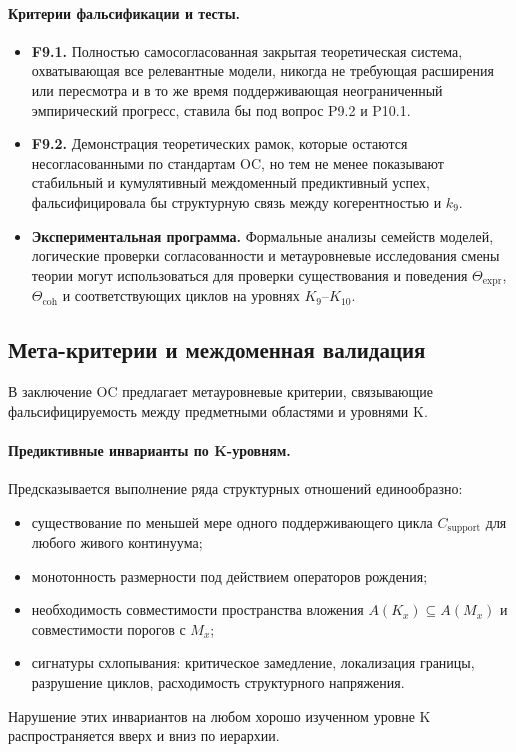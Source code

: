 \paragraph{Критерии фальсификации и тесты.}
\begin{itemize}
  \item \textbf{F9.1.}
        Полностью самосогласованная закрытая теоретическая система, охватывающая
        все релевантные модели, никогда не требующая расширения или пересмотра
        и в то же время поддерживающая неограниченный эмпирический прогресс,
        ставила бы под вопрос P9.2 и P10.1.
  \item \textbf{F9.2.}
        Демонстрация теоретических рамок, которые остаются несогласованными по
        стандартам OC, но тем не менее показывают стабильный и кумулятивный
        междоменный предиктивный успех, фальсифицировала бы структурную связь
        между когерентностью и \(k_9\).
  \item \textbf{Экспериментальная программа.}
        Формальные анализы семейств моделей, логические проверки
        согласованности и метауровневые исследования смены теории могут
        использоваться для проверки существования и поведения
        \(\Theta_{\mathrm{expr}}\), \(\Theta_{\mathrm{coh}}\) и
        соответствующих циклов на уровнях \(K_9\)–\(K_{10}\).
\end{itemize}

\subsection{Мета-критерии и междоменная валидация}

В заключение OC предлагает метауровневые критерии, связывающие
фальсифицируемость между предметными областями и уровнями K.

\paragraph{Предиктивные инварианты по K-уровням.}
Предсказывается выполнение ряда структурных отношений единообразно:
\begin{itemize}
  \item существование по меньшей мере одного поддерживающего цикла
        \(C_{\mathrm{support}}\) для любого живого континуума;
  \item монотонность размерности под действием операторов рождения;
  \item необходимость совместимости пространства вложения
        \(A(K_x)\subseteq A(M_x)\) и совместимости порогов с \(M_x\);
  \item сигнатуры схлопывания: критическое замедление, локализация границы,
        разрушение циклов, расходимость структурного напряжения.
\end{itemize}
Нарушение этих инвариантов на любом хорошо изученном уровне K
распространяется вверх и вниз по иерархии.


